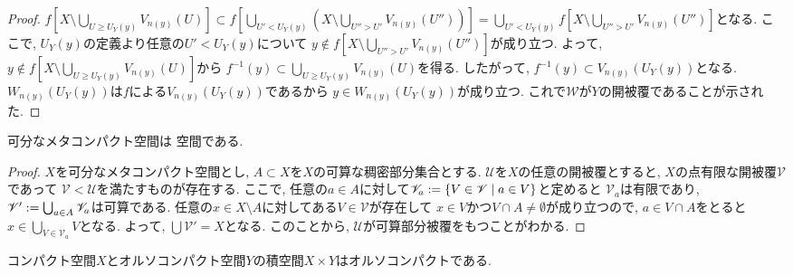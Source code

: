 \documentclass[uplatex, dvipdfmx, a4paper, 12pt, class=jsbook, crop=false]{standalone}
\begin{document}
\begin{proof}
	$ f[X \setminus \bigcup_{U \geq U_Y(y)} V_{n(y)}(U)] 
	\subset f[\bigcup_{U' < U_Y(y)} \left(X \setminus \bigcup_{U'' > U'} V_{n(y)}(U'') \right)] 
	= \bigcup_{U' < U_Y(y)} f[X \setminus \bigcup_{U'' > U'} V_{n(y)}(U'')] $となる. 
	ここで, $ U_Y(y) $の定義より任意の$ U' < U_Y(y) $について
	$ y \notin f[X \setminus \bigcup_{U'' > U'} V_{n(y)}(U'')] $が成り立つ.
	よって, $ y \notin f[X \setminus \bigcup_{U \geq U_Y(y)} V_{n(y)}(U)] $から
	$ f^{-1}(y) \subset \bigcup_{U \geq U_Y(y)} V_{n(y)}(U) $を得る.
	したがって, $ f^{-1}(y) \subset V_{n(y)}(U_Y(y)) $となる.
	$ W_{n(y)}(U_Y(y)) $は$ f $による$ V_{n(y)}(U_Y(y)) $であるから
	$ y \in W_{n(y)}(U_Y(y)) $が成り立つ. これで$ \mathscr{W} $が$ Y $の開被覆であることが示された.
\end{proof}

\begin{proposition}
	可分なメタコンパクト空間は \Lindelof 空間である.
\end{proposition}

\begin{proof}
	$ X $を可分なメタコンパクト空間とし, $ A \subset X $を$ X $の可算な稠密部分集合とする. 
	$ \mathscr{U} $を$ X $の任意の開被覆とすると, $ X $の点有限な開被覆$ \mathscr{V} $であって
	$ \mathscr{V} < \mathscr{U} $を満たすものが存在する. 
	ここで, 任意の$ a \in A $に対して$ \mathscr{V}_a \defeq \setcomp{V \in \mathscr{V}}{a \in V} $と定めると
	$ \mathscr{V}_a $は有限であり, $ \mathscr{V}' \mathrel{:=} \bigcup_{a \in A} \mathscr{V}_a $は可算である. 
	任意の$ x \in X \setminus A $に対してある$ V \in \mathscr{V} $が存在して
	$ x \in V $かつ$ V \cap A \neq \emptyset $が成り立つので, $ a \in V \cap A $をとると
	$ x \in \bigcup_{V \in \mathscr{V}_a} V $となる. よって, $ \bigcup \mathscr{V}' = X $となる. 
	このことから, $ \mathscr{U} $が可算部分被覆をもつことがわかる.
\end{proof} 

\begin{proposition}
	コンパクト空間$ X $とオルソコンパクト空間$ Y $の積空間$ X \times Y $はオルソコンパクトである.
\end{proposition}
\end{document}
